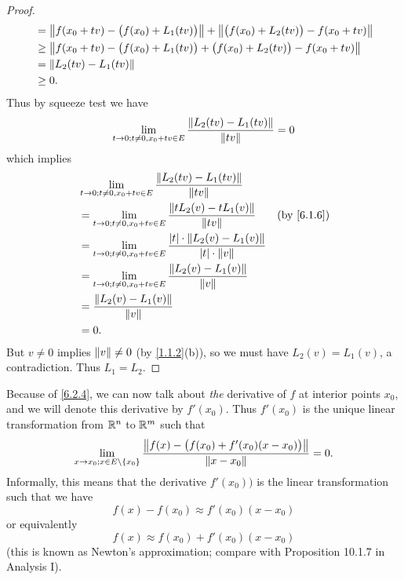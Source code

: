 \begin{proof}
\begin{align*}
     & = \norm*{f(x_0 + tv) - \big(f(x_0) + L_1(tv)\big)} + \norm*{\big(f(x_0) + L_2(tv)\big) - f(x_0 + tv)} \\
     & \geq \norm*{f(x_0 + tv) - \big(f(x_0) + L_1(tv)\big) + \big(f(x_0) + L_2(tv)\big) - f(x_0 + tv)}      \\
     & = \norm*{L_2(tv) - L_1(tv)}                                                                           \\
     & \geq 0.
  \end{align*}
  Thus by squeeze test we have
  \[
    \lim_{t \to 0 ; t \neq 0, x_0 + tv \in E} \frac{\norm*{L_2(tv) - L_1(tv)}}{\norm*{tv}} = 0
  \]
  which implies
  \begin{align*}
     & \lim_{t \to 0 ; t \neq 0, x_0 + tv \in E} \frac{\norm*{L_2(tv) - L_1(tv)}}{\norm*{tv}}                                                       \\
     & = \lim_{t \to 0 ; t \neq 0, x_0 + tv \in E} \frac{\norm*{t L_2(v) - t L_1(v)}}{\norm*{tv}}                        & \text{(by \cref{6.1.6})} \\
     & = \lim_{t \to 0 ; t \neq 0, x_0 + tv \in E} \frac{\abs{t} \cdot \norm*{L_2(v) - L_1(v)}}{\abs{t} \cdot \norm*{v}}                            \\
     & = \lim_{t \to 0 ; t \neq 0, x_0 + tv \in E} \frac{\norm*{L_2(v) - L_1(v)}}{\norm*{v}}                                                        \\
     & = \frac{\norm*{L_2(v) - L_1(v)}}{\norm*{v}}                                                                                                  \\
     & = 0.
  \end{align*}
  But \(v \neq 0\) implies \(\norm*{v} \neq 0\) (by \cref{1.1.2}(b)), so we must have \(L_2(v) = L_1(v)\), a contradiction.
  Thus \(L_1 = L_2\).
\end{proof}

\begin{note}
  Because of \cref{6.2.4}, we can now talk about \emph{the} derivative of \(f\) at interior points \(x_0\), and we will denote this derivative by \(f'(x_0)\).
  Thus \(f'(x_0)\) is the unique linear transformation from \(\R^n\) to \(\R^m\) such that
  \[
    \lim_{x \to x_0 ; x \in E \setminus \{x_0\}} \frac{\norm*{f(x) - \big(f(x_0) + f'(x_0)(x - x_0)\big)}}{\norm*{x - x_0}} = 0.
  \]
  Informally, this means that the derivative \(f'(x_0))\) is the linear transformation such that we have
  \[
    f(x) - f(x_0) \approx f'(x_0)(x - x_0)
  \]
  or equivalently
  \[
    f(x) \approx f(x_0) + f'(x_0)(x - x_0)
  \]
  (this is known as Newton's approximation;
  compare with Proposition 10.1.7 in Analysis I).
\end{note}

